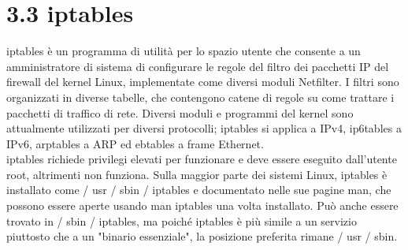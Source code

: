 \section*{3.3 \hspace{1cm} iptables}
iptables è un programma di utilità per lo spazio utente che consente a un amministratore di sistema di configurare le regole del filtro dei pacchetti IP del firewall del kernel Linux, implementate come diversi moduli Netfilter. I filtri sono organizzati in diverse tabelle, che contengono catene di regole su come trattare i pacchetti di traffico di rete. Diversi moduli e programmi del kernel sono attualmente utilizzati per diversi protocolli; iptables si applica a IPv4, ip6tables a IPv6, arptables a ARP ed ebtables a frame Ethernet. \\

iptables richiede privilegi elevati per funzionare e deve essere eseguito dall'utente root, altrimenti non funziona. Sulla maggior parte dei sistemi Linux, iptables è installato come / usr / sbin / iptables e documentato nelle sue pagine man, che possono essere aperte usando man iptables una volta installato. Può anche essere trovato in / sbin / iptables, ma poiché iptables è più simile a un servizio piuttosto che a un "binario essenziale", la posizione preferita rimane / usr / sbin.